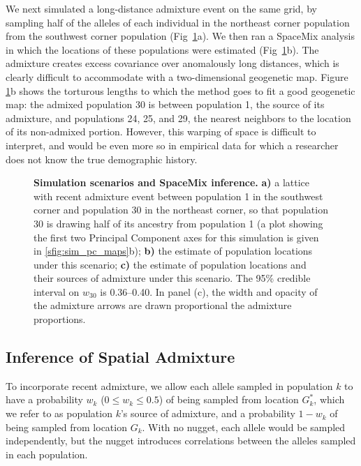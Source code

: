 \documentclass[10pt,letterpaper]{article}
\newcommand{\kadmixsource}[1]{{$G^{*}_{#1}$}}
\begin{document}
We next simulated a long-distance admixture event on the same grid,
by sampling half of the alleles of each individual in the northeast corner population from the southwest corner population (Fig\ \ref{sfig:corner_admix_scenarios}a).  We then ran a SpaceMix analysis in which the locations of these populations were estimated (Fig\ \ref{sfig:corner_admix_scenarios}b).
The admixture creates excess covariance over anomalously long distances, which is clearly difficult to accommodate with a two-dimensional geogenetic map.
Figure \ref{sfig:corner_admix_scenarios}b shows the torturous lengths to which the method goes to fit a good geogenetic map: the admixed population 30 is between population 1, the source of its admixture, and populations 24, 25, and 29, the nearest neighbors to the location of its non-admixed portion.
However, this warping of space is difficult to interpret, and would be even more so in empirical data for which a researcher does not know the true demographic history.  
%
\begin{figure}[ht!]
\begin{center}
\end{center}
\caption{
\textbf{Simulation scenarios and SpaceMix inference.}  
	\textbf{a)} 
	a lattice with recent admixture event between population 1 in the southwest corner and population 30 in the northeast corner, so that population 30 is drawing half of its ancestry from population 1 (a plot showing the first two Principal Component axes for this simulation is given in \ref{sfig:sim_pc_maps}b); 
	\textbf{b)} 
	the estimate of population locations under this scenario; 
	\textbf{c)}
	the estimate of population locations and their sources of admixture under this scenario.  The 95\% credible interval on $w_{30}$ is 0.36--0.40. In panel (c), the width and opacity of the admixture arrows are drawn proportional the admixture proportions.}\label{sfig:corner_admix_scenarios}
\end{figure}


\subsection*{Inference of Spatial Admixture}

To incorporate recent admixture, 
we allow each allele sampled in population $k$ to have a probability $w_k$ ($0 \leq w_k \leq 0.5$) of being sampled from location \kadmixsource{k},
which we refer to as population $k$'s source of admixture,
and a probability $1-w_k$ of being sampled from location $G_k$.
With no nugget, each allele would be sampled independently, but the nugget introduces correlations between the alleles sampled in each population.
\end{document}
